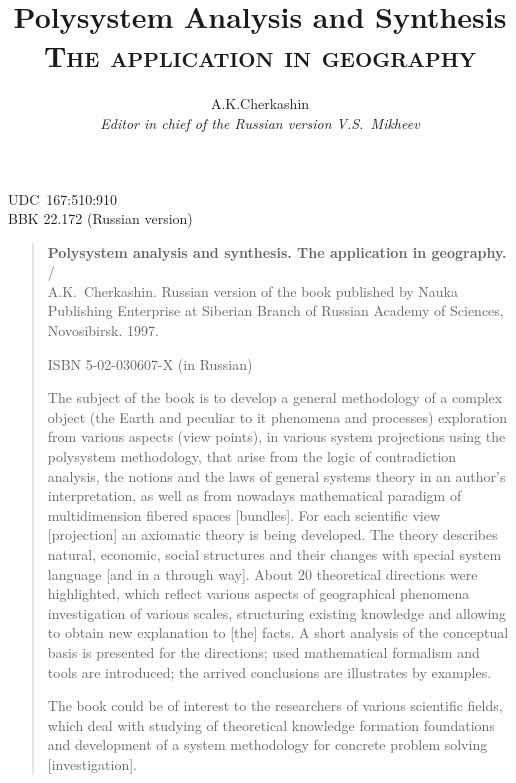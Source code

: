 \documentclass[12pt,leqno]{book}
\title{Polysystem Analysis and Synthesis\\\textsc{\small{} The application in geography}  }
\author{A.K.Cherkashin  \\
{\small\em Editor in chief of the Russian version V.S.~Mikheev }}
\date{ }
\begin{document}
\maketitle
{}
\newpage{}
\pagestyle{empty}
\noindent{}UDC~167:510:910\\{}
BBK 22.172 (Russian version)
\vfill
\begin{quote}
\small{}
\textbf{Polysystem analysis and synthesis. The application in geography.} /\\{}
A.K.~Cherkashin. Russian version of the book published by Nauka Publishing Enterprise at Siberian Branch of Russian Academy of Sciences, Novosibirsk. 1997.

ISBN 5-02-030607-X (in Russian)

The subject of the book is to develop a general methodology of a complex object (the Earth and peculiar to it phenomena and processes) exploration from various aspects (view points), in various system projections using the polysystem methodology, that arise from the logic of contradiction analysis, the notions and the laws of general systems theory in an author's interpretation, as well as from nowadays mathematical paradigm of multidimension fibered spaces [bundles]. For each scientific view [projection] an axiomatic theory is being developed. The theory describes natural, economic, social structures and their changes with special system language [and in a through way]. About 20 theoretical directions were highlighted, which reflect various aspects of geographical phenomena investigation of various scales, structuring existing knowledge and allowing to obtain new explanation to [the] facts. A short analysis of the conceptual basis is presented for the directions; used mathematical formalism and tools are introduced; the arrived conclusions are illustrates by examples.

The book could be of interest to the researchers of various scientific fields, which deal with studying of theoretical knowledge formation foundations and development of a system methodology for concrete problem solving [investigation].

\vspace{1em}


\end{quote}
\end{document}
